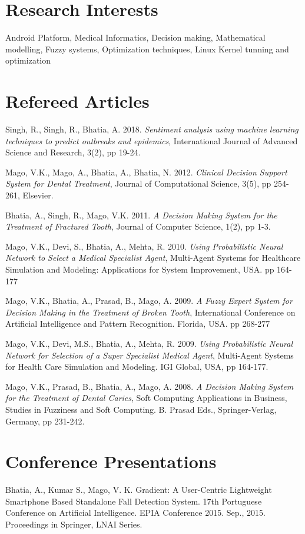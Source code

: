 \documentclass[margin,line]{res}
\begin{document}
\begin{resume}
\section{\sc Research Interests}
Android Platform, Medical Informatics, Decision making, Mathematical modelling, Fuzzy systems, Optimization techniques, Linux Kernel tunning and optimization

\section{\sc Refereed Articles}
Singh, R., Singh, R., Bhatia, A. 2018. \emph{Sentiment analysis using machine learning techniques to predict outbreaks and epidemics}, International Journal of Advanced Science and Research, 3(2), pp 19-24.

Mago, V.K., Mago, A., Bhatia, A., Bhatia, N. 2012. \emph{Clinical Decision Support System for Dental Treatment},  Journal of Computational Science, 3(5), pp 254-261, Elsevier.

Bhatia, A., Singh, R., Mago, V.K. 2011. \emph{A Decision Making System for the Treatment of Fractured Tooth}, Journal of Computer Science, 1(2), pp 1-3.

Mago, V.K., Devi, S., Bhatia, A., Mehta, R. 2010. \emph{Using Probabilistic Neural Network to Select a Medical Specialist Agent}, Multi-Agent Systems for Healthcare Simulation and Modeling: Applications for System Improvement, USA. pp 164-177

Mago, V.K., Bhatia, A., Prasad,  B., Mago, A. 2009. \emph{A Fuzzy Expert System for Decision Making in the Treatment of Broken Tooth}, International Conference on Artificial Intelligence and Pattern Recognition. Florida, USA. pp 268-277

Mago, V.K., Devi, M.S., Bhatia, A., Mehta, R. 2009. \emph{Using Probabilistic Neural Network for Selection of a Super Specialist Medical Agent}, Multi-Agent Systems for Health Care Simulation and Modeling. IGI Global, USA, pp 164-177.

Mago, V.K., Prasad, B., Bhatia, A., Mago, A. 2008. \emph{A Decision Making System for the Treatment of Dental Caries}, Soft Computing Applications in Business, Studies in Fuzziness and Soft Computing. B. Prasad Eds., Springer-Verlag, Germany, pp 231-242.

\section{\sc Conference Presentations}
Bhatia, A., Kumar S., Mago, V. K. Gradient: A User-Centric Lightweight Smartphone Based Standalone Fall Detection System. 17th Portuguese Conference on Artificial Intelligence. EPIA Conference 2015. Sep., 2015. Proceedings in Springer, LNAI Series.


\end{resume}
\end{document}
